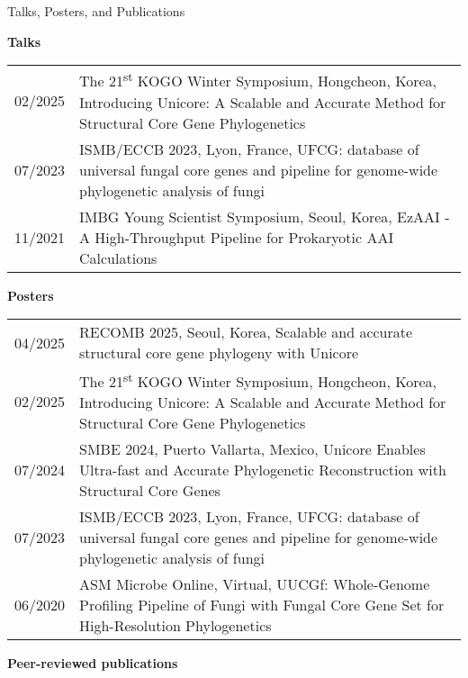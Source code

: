 \documentclass{resume} %
\newcommand{\subheading}[1]{%
  \vspace{0.5mm}%
  {\fontsize{11.5pt}{13pt}\selectfont\bfseries #1}%
  \vspace{1mm}%
}
\begin{document}
\begin{rSection}{Talks, Posters, and Publications}
\vspace{1mm}

\subheading{Talks}

\begin{tabular}{p{2.5cm}p{14.1cm}}
02/2025 & The 21\textsuperscript{st} KOGO Winter Symposium, Hongcheon, Korea, Introducing Unicore: A Scalable and Accurate Method for Structural Core Gene Phylogenetics
\\[1mm]
07/2023 & ISMB/ECCB 2023, Lyon, France, UFCG: database of universal fungal core genes and pipeline for genome-wide phylogenetic analysis of fungi
\\[1mm]
11/2021 & IMBG Young Scientist Symposium, Seoul, Korea, EzAAI - A High-Throughput Pipeline for Prokaryotic AAI Calculations
\\[1mm]
\end{tabular}
\vspace{1mm}

\subheading{Posters}

\begin{tabular}{p{2.5cm}p{14.1cm}}
04/2025 & RECOMB 2025, Seoul, Korea, Scalable and accurate structural core gene phylogeny with Unicore
\\[1mm]
02/2025 & The 21\textsuperscript{st} KOGO Winter Symposium, Hongcheon, Korea, Introducing Unicore: A Scalable and Accurate Method for Structural Core Gene Phylogenetics
\\[1mm]
07/2024 & SMBE 2024, Puerto Vallarta, Mexico, Unicore Enables Ultra-fast and Accurate Phylogenetic Reconstruction with Structural Core Genes
\\[1mm]
07/2023 & ISMB/ECCB 2023, Lyon, France, UFCG: database of universal fungal core genes and pipeline for genome-wide phylogenetic analysis of fungi
\\[1mm]
06/2020 & ASM Microbe Online, Virtual, UUCGf: Whole-Genome Profiling Pipeline of Fungi with Fungal Core Gene Set for High-Resolution Phylogenetics
\\[1mm]
\end{tabular}
\vspace{1mm}
\newpage

\subheading{Peer-reviewed publications}\\[-26mm]

\begin{thebibliography}{10}

\vspace{8mm}


\end{thebibliography}
\end{rSection}
\end{document}
